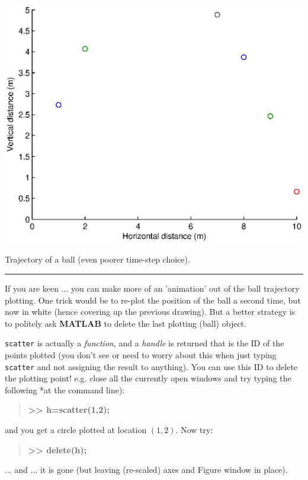 \documentclass{tufte-book} %
\newenvironment{docspecbold}{\begin{quotation}\ttfamily\bfseries\parskip0pt\parindent0pt\ignorespaces}{\end{quotation}}
\begin{document}
\begin{marginfigure}[-0.0in]
\includegraphics[width=\linewidth]{ch9-ball_uv3.eps}
\caption{Trajectory of a ball (even poorer time-step choice).}
\label{fig:ch9-ball_uv3}
\end{marginfigure}

\vspace{1mm}
\noindent\rule{4cm}{0.5pt}
\vspace{2mm}

\noindent If you are keen ... you can make more of an 'animation' out of the ball trajectory plotting. One trick would be to re-plot the position of the ball a second time, but now in white (hence covering up the previous drawing). But a better strategy is to politely ask \textbf{MATLAB} to delete the last plotting (ball) object.

\texttt{scatter} is actually a \textit{function}, and a \textit{handle} is returned that is the ID of the points plotted (you don't see or need to worry about this when just typing \texttt{scatter} and not assigning the result to anything). You can use this ID to delete the plotting point! e.g. close all the currently open windows and try typing the following *at the command line):
\begin{docspecbold}
>> h=scatter(1,2);
\end{docspecbold}
and you get a circle plotted at location \((1,2)\). Now try:
 \begin{docspecbold}
>> delete(h);
\end{docspecbold}
... and ... it is gone (but leaving (re-scaled) axes and Figure window in place).
\end{document}
